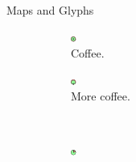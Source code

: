 \documentclass{beamer}
\begin{document}
\begin{frame}{Maps and Glyphs}
  \begin{figure}[!b]
    \centering
    \begin{subfigure}[b]{0.45\linewidth}
      \centering
      \includegraphics[width=0.5\linewidth]{assets/symbol_nested_circles}
      \caption{Coffee.}
    \end{subfigure}
    \begin{subfigure}[b]{0.45\linewidth}
      \centering
      \includegraphics[width=0.5\linewidth]{assets/symbol_nested_elastic_circles}
      \caption{More coffee.}
    \end{subfigure}\\
    \begin{subfigure}[b]{0.45\linewidth}
      \centering
      \includegraphics[width=0.5\linewidth]{assets/symbol_pie}

\end{subfigure}
\end{figure}
\end{frame}
\end{document}
